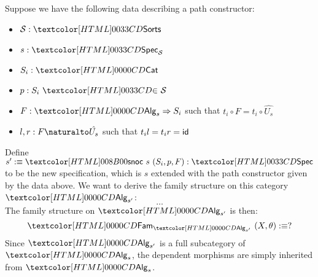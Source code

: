 Suppose we have the following data describing a path constructor:
%
\begin{itemize}
\item $\Ss : \sortsty$
\item $s : \specty_{\Ss}$
\item $S_i : \Cat$
\item $p : \sortsin{S_i}{\Ss}$
\item $F : \Func{\Alg_s}{S_i}$ such that $t_i \circ F = t_i \circ \hat{U_s}$
\item $l , r : \Nat{F}{\hat{U_s}}$ such that $t_i l = t_i r = \id$
\end{itemize}

Define $s' \ddefeq \specsnoc\ s\ (S_i,p,F) : \specty$ to be the new
specification, which is $s$ extended with the path constructor given by
the data above. We want to derive the family structure on this
category $\Alg_{s'}$:
$$
\hdots
$$
The family structure on $\Alg_{s'}$ is then:
$$
  \Fam_{\Alg_{s'}}\ (X , \theta) \ddefeq ? \\
$$
Since $\Alg_{s'}$ is a full subcategory of $\Alg_s$, the dependent
morphisms are simply inherited from $\Alg_s$.
